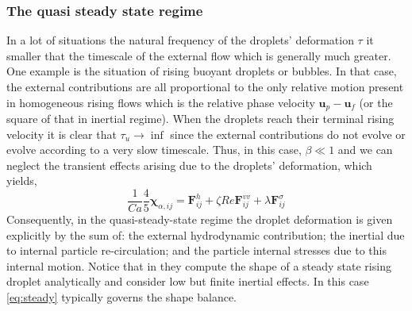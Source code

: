 \subsubsection{The quasi steady state regime}

In a lot of situations the natural frequency of the droplets' deformation $\tau$ it smaller that the timescale of the external flow which is generally much greater. 
One example is the situation of rising buoyant droplets or bubbles. 
In that case, the external contributions are all proportional to the only relative motion present in homogeneous rising flows which is the relative phase velocity $\textbf{u}_p-\textbf{u}_f$ (or the square of that in inertial regime).
When the droplets reach their terminal rising velocity it is clear that $\tau_u \to \inf$ since the external contributions do not evolve or evolve according to a very slow timescale. 
Thus, in this case, $\beta \ll 1$ and we can neglect the transient effects arising due to the droplets' deformation, which yields, 
\begin{equation}
    \frac{1}{Ca}
    \frac{4  }{5} \bm\chi_{\alpha,ij}
    = \textbf{F}_{ij}^h 
    + \zeta Re \textbf{F}_{ij}^{vv}
    + \lambda \textbf{F}_{ij}^{\sigma}
    \label{eq:steady}
\end{equation}
Consequently, in the quasi-steady-state regime the droplet deformation is given explicitly by the sum of: the external hydrodynamic contribution; the inertial due to internal particle re-circulation; and the particle internal stresses due to this internal motion. 
Notice that in \citet{taylor1964deformation} they compute the shape of a steady state rising droplet analytically and consider low but finite inertial effects. 
In this case \ref{eq:steady} typically governs the shape balance.
 

